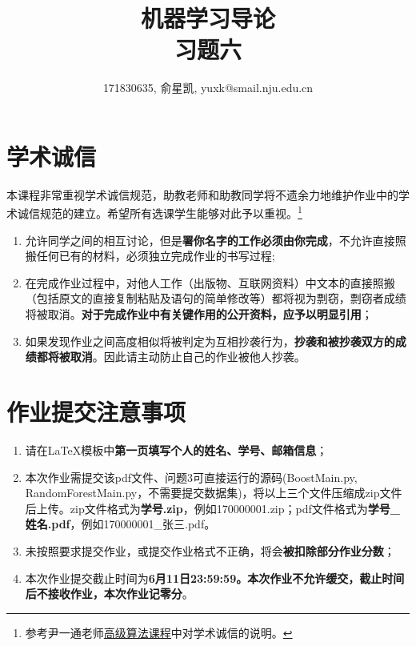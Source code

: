 \documentclass[a4paper,UTF8]{article}
\theoremstyle{definition}
\begin{document}
	\title{机器学习导论\\
		习题六}
	\author{171830635, 俞星凯, yuxk@smail.nju.edu.cn}
	\maketitle
	
	
	\section*{学术诚信}
	
	本课程非常重视学术诚信规范，助教老师和助教同学将不遗余力地维护作业中的学术诚信规范的建立。希望所有选课学生能够对此予以重视。\footnote{参考尹一通老师\href{http://tcs.nju.edu.cn/wiki/}{高级算法课程}中对学术诚信的说明。}
	
	\begin{tcolorbox}
		\begin{enumerate}
			\item[(1)] 允许同学之间的相互讨论，但是{\color{red}\textbf{署你名字的工作必须由你完成}}，不允许直接照搬任何已有的材料，必须独立完成作业的书写过程;
			\item[(2)] 在完成作业过程中，对他人工作（出版物、互联网资料）中文本的直接照搬（包括原文的直接复制粘贴及语句的简单修改等）都将视为剽窃，剽窃者成绩将被取消。{\color{red}\textbf{对于完成作业中有关键作用的公开资料，应予以明显引用}}；
			\item[(3)] 如果发现作业之间高度相似将被判定为互相抄袭行为，{\color{red}\textbf{抄袭和被抄袭双方的成绩都将被取消}}。因此请主动防止自己的作业被他人抄袭。
		\end{enumerate}
	\end{tcolorbox}
	
	\section*{作业提交注意事项}
	\begin{tcolorbox}
		\begin{enumerate}
			\item[(1)] 请在\LaTeX 模板中{\color{red}\textbf{第一页填写个人的姓名、学号、邮箱信息}}；
			\item[(2)] 本次作业需提交该pdf文件、问题3可直接运行的源码(BoostMain.py, RandomForestMain.py，不需要提交数据集)，将以上三个文件压缩成zip文件后上传。zip文件格式为{\color{red}\textbf{学号.zip}}，例如170000001.zip；pdf文件格式为{\color{red}\textbf{学号\_姓名.pdf}}，例如170000001\_张三.pdf。
			\item[(3)] 未按照要求提交作业，或提交作业格式不正确，将会{\color{red}\textbf{被扣除部分作业分数}}；
			\item[(4)] 本次作业提交截止时间为{\color{red}\textbf{6月11日23:59:59。本次作业不允许缓交，截止时间后不接收作业，本次作业记零分}}。
		\end{enumerate}
	\end{tcolorbox}
	
\end{document}
